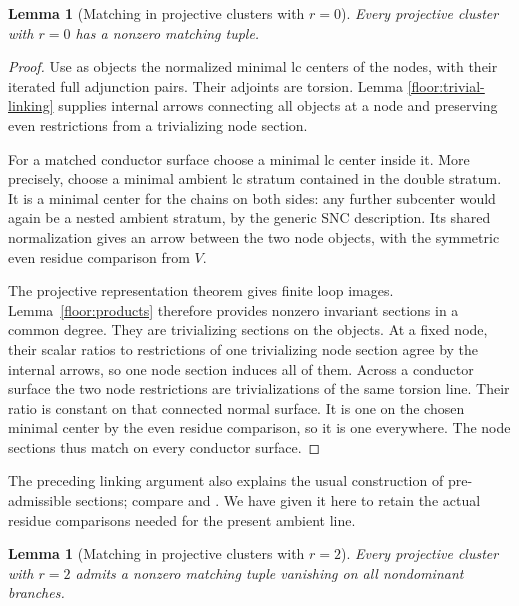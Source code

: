 \documentclass[11pt,letterpaper]{article}
\newtheorem{lemma}[theorem]{Lemma}
\theoremstyle{definition}
\theoremstyle{remark}
\begin{document}
\begin{lemma}[Matching in projective clusters with $r=0$]
\label{floor:projective-r0}
Every projective cluster with $r=0$ has a nonzero matching
tuple.
\end{lemma}

\begin{proof}
Use as objects the normalized minimal lc centers of the
nodes, with their iterated full adjunction pairs.
Their adjoints are torsion.  Lemma
\ref{floor:trivial-linking} supplies internal arrows
connecting all objects at a node and preserving even
restrictions from a trivializing node section.

For a matched conductor surface choose a minimal lc
center inside it.  More precisely, choose a minimal
ambient lc stratum contained in the double stratum.
It is a minimal center for the chains on both sides:
any further subcenter would again be a nested ambient
stratum, by the generic SNC description.  Its shared
normalization gives an arrow between the two node
objects, with the symmetric even residue comparison
from $V$.

The projective representation theorem gives finite
loop images.  Lemma~\ref{floor:products} therefore
provides nonzero invariant sections in a common
degree.  They are trivializing sections on the
objects.  At a fixed node, their scalar ratios to
restrictions of one trivializing node section agree
by the internal arrows, so one node section induces
all of them.  Across a conductor surface the two
node restrictions are trivializations of the same
torsion line.  Their ratio is constant on that
connected normal surface.  It is one on the chosen
minimal center by the even residue comparison, so
it is one everywhere.  The node sections thus match
on every conductor surface.
\end{proof}

The preceding linking argument also explains the
usual construction of pre-admissible sections; compare
\cite[Section~5]{GongyoNumericallyTrivial}
and \cite{KollarSources}.  We have given it here to retain
the actual residue comparisons needed for the present
ambient line.

\begin{lemma}[Matching in projective clusters with $r=2$]
\label{floor:projective-r2}
Every projective cluster with $r=2$ admits a nonzero
matching tuple vanishing on all nondominant branches.
\end{lemma}
\end{document}
